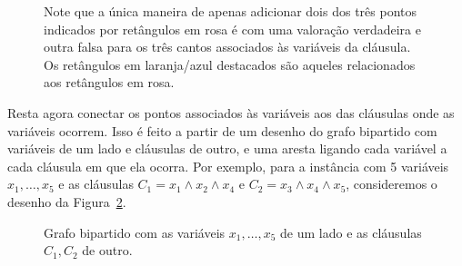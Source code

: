 \begin{figure}
    \caption{Note que a única maneira de apenas adicionar dois dos três pontos indicados por retângulos em rosa é com uma valoração verdadeira e outra falsa para os três cantos associados às variáveis da cláusula. Os retângulos em laranja/azul destacados são aqueles relacionados aos retângulos em rosa.}
\label{fig:clausula}
\end{figure}

Resta agora conectar os pontos associados às variáveis aos das cláusulas onde as variáveis ocorrem. Isso é feito a partir de um desenho do grafo bipartido com variáveis de um lado e cláusulas de outro, e uma aresta ligando cada variável a cada cláusula em que ela ocorra. Por exemplo, para a instância com 5 variáveis $x_1,\ldots,x_5$ e as cláusulas $C_1 = x_1 \land x_2 \land x_4$ e $C_2 = x_3 \land x_4 \land x_5$, consideremos o desenho da Figura~\ref{fig:desenho}.

\begin{figure}
\caption{Grafo bipartido com as variáveis $x_1,\ldots,x_5$ de um lado e as cláusulas $C_1,C_2$ de outro.}
\label{fig:desenho}
\end{figure}

